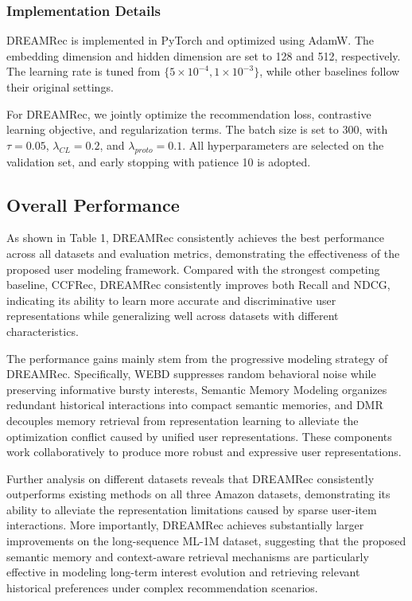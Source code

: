 \documentclass[letterpaper]{article} %
\theoremstyle{definition} %
\begin{document}
\subsubsection{Implementation Details}

DREAMRec is implemented in PyTorch and optimized using AdamW. The embedding dimension and hidden dimension are set to 128 and 512, respectively. The learning rate is tuned from $\{5\times10^{-4},1\times10^{-3}\}$, while other baselines follow their original settings.

For DREAMRec, we jointly optimize the recommendation loss, contrastive learning objective, and regularization terms. The batch size is set to 300, with $\tau=0.05$, $\lambda_{CL}=0.2$, and $\lambda_{proto}=0.1$. All hyperparameters are selected on the validation set, and early stopping with patience 10 is adopted.

\subsection{Overall Performance}
As shown in Table 1, DREAMRec consistently achieves the best performance across all datasets and evaluation metrics, demonstrating the effectiveness of the proposed user modeling framework. Compared with the strongest competing baseline, CCFRec, DREAMRec consistently improves both Recall and NDCG, indicating its ability to learn more accurate and discriminative user representations while generalizing well across datasets with different characteristics.

The performance gains mainly stem from the progressive modeling strategy of DREAMRec. Specifically, WEBD suppresses random behavioral noise while preserving informative bursty interests, Semantic Memory Modeling organizes redundant historical interactions into compact semantic memories, and DMR decouples memory retrieval from representation learning to alleviate the optimization conflict caused by unified user representations. These components work collaboratively to produce more robust and expressive user representations.

Further analysis on different datasets reveals that DREAMRec consistently outperforms existing methods on all three Amazon datasets, demonstrating its ability to alleviate the representation limitations caused by sparse user-item interactions. More importantly, DREAMRec achieves substantially larger improvements on the long-sequence ML-1M dataset, suggesting that the proposed semantic memory and context-aware retrieval mechanisms are particularly effective in modeling long-term interest evolution and retrieving relevant historical preferences under complex recommendation scenarios.
\end{document}
